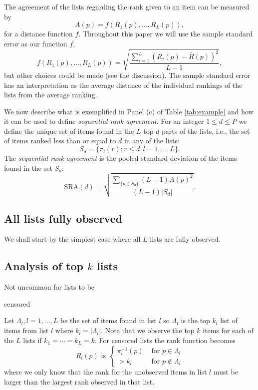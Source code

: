 \documentclass[12pt,a4paper]{article}\usepackage[]{graphicx}\usepackage[]{color}
\begin{document}
The agreement of the lists regarding the rank given to an item can be
measured by
\begin{equation}
  A(p) = f(R_1(p), \ldots, R_L(p)),
\end{equation}
for a distance function $f$. Throughout this paper we will use the
sample standard error as our function $f$,
$$f(R_1(p), \ldots, R_L(p)) = \sqrt{\frac{\sum_{i=1}^L (R_i(p) - \bar{R}(p))^2}{L-1}},
$$
but other choices could be made (see the discussion). The sample
standard error has an interpretation as the average distance of the
individual rankings of the lists from the average ranking.

We now describe what is exemplified in Panel (c) of Table
\ref{tab:example} and how it can be used to define \emph{sequential
  rank agreement}. For an integer $1\le d\le P$ we define the unique
set of items found in the $L$ top $d$ parts of the lists, i.e., the
set of items ranked less than or equal to $d$ in any of the lists:
\begin{equation}
S_d = \{\pi_l(r) ; r \leq d, l = 1, \ldots, L \}.
\end{equation}
The \emph{sequential rank agreement} is the pooled standard deviation
of the items found in the set $S_d$:
\begin{equation}
\textrm{SRA}(d)= \sqrt{\frac{\sum_{\{p \in S_d\}}(L-1)A(p)^2}{(L-1) |S_d|}}.
\end{equation}

\subsection{All lists fully observed}
We shall start by the simplest case where all $L$ lists are fully observed. 

\subsection{Analysis of top $k$ lists}
Not uncommon for lists to be 


censored


Let $\Lambda_l, l=1, \ldots, L$ be the set of items found in list $l$ so $\Lambda_l$ is the top $k_l$ list of items from list $l$ where $k_l = |\Lambda_l|$. Note that we observe the top $k$ items for each of the $L$ lists if $k_1=\cdots=k_L=k$. For censored lists the rank function becomes
\begin{equation}
R_l(p) \text{ is } \left\{\begin{array}{cl} \pi_l^{-1}(p) & \text{ for } p\in \Lambda_l \\ 
> k_l & \text{ for } p \not\in \Lambda_l\end{array}\right.
\end{equation}
where we only know that the rank for the unobserved items in list $l$ must be larger than the largest rank observed in that list.
\end{document}
